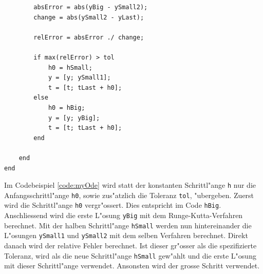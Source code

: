 \begin{refsection}
\begin{lstlisting}[style=MATLAB, caption=Variable Schrittl"ange, captionpos=b, label=code:myOde]
        % Fehlerberechnung
        absError = abs(yBig - ySmall2);
        change = abs(ySmall2 - yLast);
        
        relError = absError ./ change;
        
        if max(relError) > tol
            h0 = hSmall;
            y = [y; ySmall1];
            t = [t; tLast + h0];
        else
            h0 = hBig;
            y = [y; yBig]; 
            t = [t; tLast + h0];           
        end
         
    end
end
\end{lstlisting}

Im Codebeispiel \ref{code:myOde} wird statt der konstanten Schrittl"ange \texttt{h} nur die Anfangsschrittl"ange \texttt{h0}, sowie zus"atzlich die Toleranz \texttt{tol}, "ubergeben.
Zuerst wird die Schrittl"ange \texttt{h0} vergr"ossert.
Dies entspricht im Code \texttt{hBig}.
Anschliessend wird die erste L"osung \texttt{yBig} mit dem Runge-Kutta-Verfahren berechnet.
Mit der halben Schrittl"ange \texttt{hSmall} werden nun hintereinander die L"osungen \texttt{ySmall1} und \texttt{ySmall2} mit dem selben Verfahren berechnet.
Direkt danach wird der relative Fehler berechnet.
Ist dieser gr"osser als die spezifizierte Toleranz, wird als die neue Schrittl"ange \texttt{hSmall} gew"ahlt und die erste L"osung mit dieser Schrittl"ange verwendet.
Ansonsten wird der grosse Schritt verwendet.


\end{refsection}
